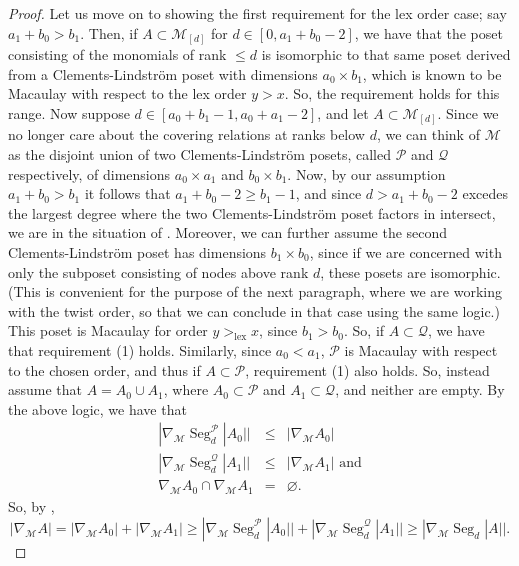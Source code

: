 \documentclass[11pt, reqno]{amsart}
\newcommand{\Q}{{\mathcal Q}}
\renewcommand{\P}{{\mathcal P}}
\def\lex{\operatorname{lex}}
\def\Seg{\operatorname{Seg}}
\theoremstyle{plain} %
\theoremstyle{definition}
\theoremstyle{remark}
\numberwithin{equation}{section}  %
\begin{document}
\begin{proof}
Let us move on to showing the first requirement for the lex order case; say $a_1+b_0 > b_1$. Then, if $A \subset \mathcal{M}_{[d]}$ for $d \in [0,a_1+b_0-2]$, we have that the poset consisting of the monomials of rank $\leq d$ is isomorphic to that same poset derived from a Clements-Lindstr\"om poset with dimensions $a_0 \times b_1$, which is known to be Macaulay with respect to the lex order $y > x$. So, the requirement holds for this range. Now suppose $d \in [a_0+b_1-1,a_0+a_1-2]$, and let $A \subset \mathcal{M}_{[d]}$. Since we no longer care about the covering relations at ranks below $d$, we can think of $\mathcal{M}$ as the disjoint union of two Clements-Lindstr\"om posets, called $\P$ and $\Q$ respectively, of dimensions $a_0 \times a_1$ and $b_0 \times b_1$. Now,  by our assumption $a_1+b_0 > b_1$ it follows that $a_1+b_0-2 \geq b_1-1$, and since $d > a_1+b_0-2$ excedes the largest degree where the two Clements-Lindstr\"om poset factors in  intersect, we are in the situation of . Moreover, we can further assume the second Clements-Lindstr\"om poset has dimensions $b_1 \times b_0$, since if we are concerned with only the subposet consisting of nodes above rank $d$, these posets are isomorphic. 
 (This is convenient for the purpose of the next paragraph, where we are working with the twist order, so that we can conclude in that case using the same logic.) 
This poset is Macaulay for order $y >_{\lex} x$, since $b_1 > b_0$. So, if $A\subset \Q$, we have that requirement (1) holds. Similarly, since $a_0 < a_1$, $\P$ is Macaulay with respect to the chosen order, and thus if $A \subset \P$, requirement (1) also holds. So, instead assume that $A = A_0 \cup A_1$, where $A_0 \subset \P$ and $A_1 \subset \Q$, and neither are empty. By the above logic, we have that 
\begin{eqnarray*}
    |\nabla_{\mathcal{M}}\Seg_d^\P|A_0|| &\leq& |\nabla_{\mathcal{M}}A_0|\\ |\nabla_{\mathcal{M}}\Seg_d^\Q|A_1|| &\leq& |\nabla_{\mathcal{M}}A_1| \text{ and}\\
    \nabla_{\mathcal{M}}A_0 \cap \nabla_{\mathcal{M}}A_1 &=& \varnothing.
\end{eqnarray*}
So, by , 
\[|\nabla_{\mathcal{M}}A| = |\nabla_{\mathcal{M}}A_0| + |\nabla_{\mathcal{M}}A_1| \geq |\nabla_{\mathcal{M}}\Seg_d^\P|A_0|| + |\nabla_{\mathcal{M}}\Seg_d^\Q|A_1|| \geq |\nabla_{\mathcal{M}}\Seg_d|A||.
\]


\end{proof}
\end{document}
